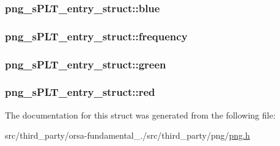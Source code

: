 \subsubsection[{blue}]{ png\+\_\+s\+P\+L\+T\+\_\+entry\+\_\+struct\+::blue}\label{structpng__sPLT__entry__struct_a2af6281d3b400362886a43977ebcb7db}
\hypertarget{structpng__sPLT__entry__struct_ad8095a15bb5a054c12ef911478c5f3a3}{}
\subsubsection[{frequency}]{ png\+\_\+s\+P\+L\+T\+\_\+entry\+\_\+struct\+::frequency}\label{structpng__sPLT__entry__struct_ad8095a15bb5a054c12ef911478c5f3a3}
\hypertarget{structpng__sPLT__entry__struct_a3b4269fb63b4087bd618a6741b805554}{}
\subsubsection[{green}]{ png\+\_\+s\+P\+L\+T\+\_\+entry\+\_\+struct\+::green}\label{structpng__sPLT__entry__struct_a3b4269fb63b4087bd618a6741b805554}
\hypertarget{structpng__sPLT__entry__struct_a05ba3cef8aa2c43d1f52c0300c525fd9}{}
\subsubsection[{red}]{ png\+\_\+s\+P\+L\+T\+\_\+entry\+\_\+struct\+::red}\label{structpng__sPLT__entry__struct_a05ba3cef8aa2c43d1f52c0300c525fd9}


The documentation for this struct was generated from the following file\+:\begin{DoxyCompactItemize}
\item 
src/third\+\_\+party/orsa-\/fundamental\+\_./src/third\+\_\+party/png/\hyperlink{png_8h}{png.\+h}\end{DoxyCompactItemize}
